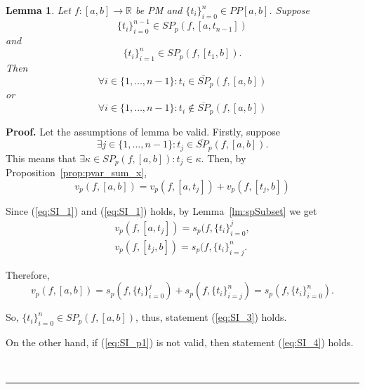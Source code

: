 \documentclass[12pt, a4paper]{article}
\newtheorem{lemma}[theorem]{Lemma}
\newenvironment{proof}[1][Proof]{\noindent \textbf{#1.} }{\  \rule{0.5em}{0.5em}}
\numberwithin{equation}{section}
\begin{document}
\begin{lemma}\label{lm:SI}
  Let $f:[a,b] \rightarrow \mathbb{R}$ be PM
  and $\{t_i\}_{i=0}^n \in PP[a, b]$.
  Suppose 
  \begin{equation}\label{eq:SI_1}
    \{t_i\}_{i=0}^{n-1} \in SP_p(f, [a, t_{n-1}]) 
  \end{equation} 
  and 
  \begin{equation}\label{eq:SI_2}
    \{t_i\}_{i=1}^{n} \in SP_p(f, [t_1, b]).
  \end{equation} 
  Then
  \begin{equation}\label{eq:SI_3}
    \forall i \in \{1,\dots,n-1\}: t_i \in \overline{SP}_p(f, [a, b])
  \end{equation} 
  or
  \begin{equation}\label{eq:SI_4}
    \forall i \in \{1,\dots,n-1\}: t_i \notin \overline{SP}_p(f, [a, b])
  \end{equation}   
\end{lemma}
\begin{proof}
  Let the assumptions of lemma be valid. 
  Firstly, suppose 
  \begin{equation}\label{eq:SI_p1}
    \exists j \in \{1,\dots,n-1\}: t_j \in \overline{SP}_p(f, [a, b]).
  \end{equation}
  This means that 
  $\exists \kappa \in SP_p(f, [a, b]): t_j \in \kappa$.
  Then, by Proposition~\ref{prop:pvar_sum_x},
  \begin{equation}
    v_p(f, [a, b]) = v_p(f, [a, t_j]) + v_p(f, [t_j, b])
  \end{equation}
  
  Since (\ref{eq:SI_1}) and (\ref{eq:SI_1}) holds, 
  by Lemma~\ref{lm:spSubset} we get 
  \begin{eqnarray}
    v_p(f, [a, t_j]) = s_p(f, \{t_i\}_{i=0}^j, \\
    v_p(f, [t_j, b]) = s_p(f, \{t_i\}_{i=j}^n.
  \end{eqnarray}
  
  Therefore,
  \begin{equation}
    v_p(f, [a, b]) = s_p(f, \{t_i\}_{i=0}^j) +  s_p(f, \{t_i\}_{i=j}^n)
      = s_p(f, \{t_i\}_{i=0}^n).
  \end{equation}  
  
  So, $\{t_i\}_{i=0}^n \in SP_p(f, [a, b])$, 
  thus, statement (\ref{eq:SI_3}) holds.
  
  On the other hand, if (\ref{eq:SI_p1}) is not valid, 
  then statement (\ref{eq:SI_4}) holds.  
  
\end{proof}
\end{document}
